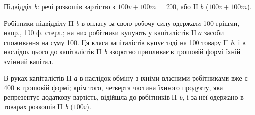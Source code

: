 Підвідділ \emph{b}: речі розкошів вартістю в $100 v + 100 m$ = 200, або
II \emph{b} ($100 v + 100 m$).

Робітники підвідділу II \emph{b} в оплату за свою робочу силу одержали
100 грішми, напр., 100 ф. стерл.; на них робітники купують у капіталістів
II \emph{а} засоби споживання на суму 100. Ця кляса капіталістів купує
тоді на 100 товару II \emph{b}, і в наслідок цього до капіталістів II \emph{b} зворотно
припливає в грошовій формі їхній змінний капітал.

В руках капіталістів II \emph{а} в наслідок обміну з їхніми власними робітниками
вже є 400 в грошовій формі; крім того, четверта частина їхнього
продукту, яка репрезентує додаткову вартість, відійшла до робітників
II \emph{b}, і за неї одержано в товарах розкошів II \emph{b} ($100 v$).
